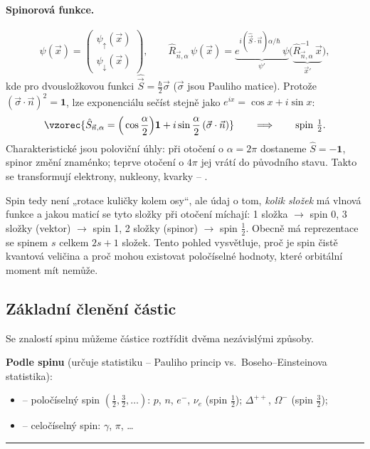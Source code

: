 \paragraph{Spinorová funkce.}
\[
  \psi(\vec x) = \begin{pmatrix} \psi_\uparrow(\vec x)\\ \psi_\downarrow(\vec x)\end{pmatrix},
  \qquad
  \hat R_{\vec n,\alpha}\,\psi(\vec x)
  = \underbrace{e^{i(\hat{\vec S}\cdot\vec n)\alpha/\hbar}\,\psi}_{\psi'}
    \big(\underbrace{\hat R^{-1}_{\vec n,\alpha}\,\vec x}_{\vec x'}\big),
\]
kde pro dvousložkovou funkci \(\hat{\vec S} = \frac{\hbar}{2}\vec\sigma\)
(\(\vec\sigma\) jsou Pauliho matice). Protože \((\vec\sigma\cdot\vec n)^2 = \mathbf{1}\),
lze exponenciálu sečíst stejně jako \(e^{ix} = \cos x + i\sin x\):
\[
  \vzorec{\hat S_{\vec n,\alpha} = \Big(\cos\frac{\alpha}{2}\Big)\mathbf{1}
  + i\sin\frac{\alpha}{2}\,(\vec\sigma\cdot\vec n)}
  \qquad\Longrightarrow\qquad \text{spin } \tfrac12 .
\]
Charakteristické jsou poloviční úhly: při otočení o \(\alpha = 2\pi\) dostaneme
\(\hat S = -\mathbf{1}\), spinor změní znaménko; teprve otočení o \(4\pi\) jej
vrátí do původního stavu. Takto se transformují elektrony, nukleony,
kvarky – .

\begin{vysvetleni}
Spin tedy není „rotace kuličky kolem osy``, ale údaj o tom, \emph{kolik
složek} má vlnová funkce a jakou maticí se tyto složky při otočení míchají:
1 složka \(\to\) spin 0, 3 složky (vektor) \(\to\) spin 1, 2 složky (spinor)
\(\to\) spin \(\tfrac12\). Obecně má reprezentace se spinem \(s\) celkem
\(2s+1\) složek. Tento pohled vysvětluje, proč je spin čistě kvantová
veličina a proč mohou existovat poločíselné hodnoty, které orbitální moment
mít nemůže.
\end{vysvetleni}

\subsection{Základní členění částic}

Se znalostí spinu můžeme částice roztřídit dvěma nezávislými způsoby.

\textbf{Podle spinu} (určuje statistiku – Pauliho princip vs.\ Boseho–Einsteinova statistika):
\begin{itemize}
  \item {} – poločíselný spin \(\left(\tfrac12, \tfrac32, \dots\right)\):
  \(p\), \(n\), \(e^-\), \(\nu_e\) (spin \(\tfrac12\)); \(\Delta^{++}\), \(\Omega^-\)
  (spin \(\tfrac32\));
  \item {} – celočíselný spin: \(\gamma\), \(\pi\), \dots
\end{itemize}
\vspace{-4pt}\noindent\rule{2.5cm}{0.4pt}

